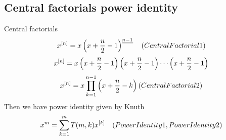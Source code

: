 \subsection{Central factorials power identity}\label{subsec:central-factorials-power-identity}
Central factorials
\begin{equation*}
    x^{[n]} = x \left(x+\frac{n}{2}-1 \right)^{\underline{n-1}} \quad
    (CentralFactorial1)
\end{equation*}
\begin{equation*}
    x^{[n]} = x \left( x+\frac{n}{2}-1 \right) \left( x+\frac{n}{2}-1 \right) \cdots \left (x+\frac{n}{2}-1 \right)
\end{equation*}
\begin{equation*}
    x^{[n]} = x \prod_{k=1}^{n-1} \left( x+\frac{n}{2}-k \right)
    (CentralFactorial2)
\end{equation*}
Then we have power identity given by Knuth
\begin{equation*}
    x^m = \sum_{k=1}^{m} T(m, k) x^{[k]} \quad
    (PowerIdentity1, PowerIdentity2)
\end{equation*}